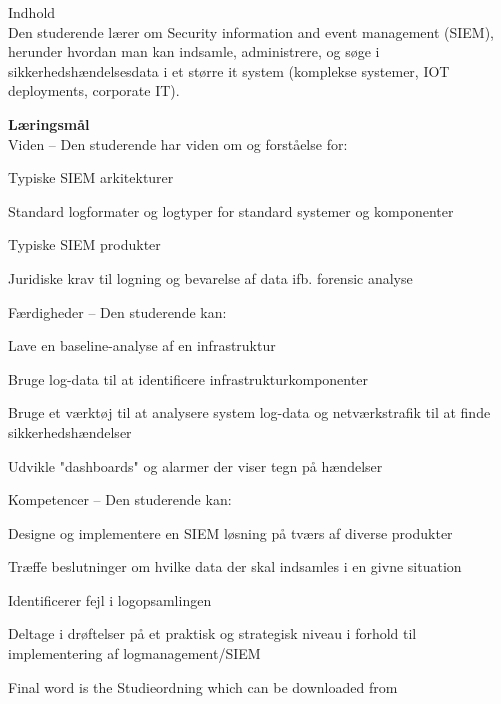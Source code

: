 \documentclass[Screen16to9,17pt]{foils}
\begin{document}
Indhold\\
Den studerende lærer om Security information and event management (SIEM), herunder
hvordan man kan indsamle, administrere, og søge i sikkerhedshændelsesdata i et større it
system (komplekse systemer, IOT deployments, corporate IT).

{\bf Læringsmål}\\
Viden -- Den studerende har viden om og forståelse for:
\begin{list2}
\item Typiske SIEM arkitekturer
\item Standard logformater og logtyper for standard systemer og komponenter
\item Typiske SIEM produkter
\item Juridiske krav til logning og bevarelse af data ifb. forensic analyse
\end{list2}

Færdigheder -- Den studerende kan:
\begin{list2}
\item Lave en baseline-analyse af en infrastruktur
\item Bruge log-data til at identificere infrastrukturkomponenter
\item Bruge et værktøj til at analysere system log-data og netværkstrafik til at finde sikkerhedshændelser
\item Udvikle "dashboards" og alarmer der viser tegn på hændelser
\end{list2}

Kompetencer -- Den studerende kan:
\begin{list2}
\item Designe og implementere en SIEM løsning på tværs af diverse produkter
\item Træffe beslutninger om hvilke data der skal indsamles i en givne situation
\item Identificerer fejl i logopsamlingen
\item Deltage i drøftelser på et praktisk og strategisk niveau i forhold til implementering af
logmanagement/SIEM
\end{list2}

Final word is the Studieordning which can be downloaded from\\
{\footnotesize {}\\
}
\end{document}
